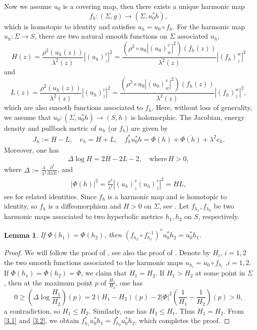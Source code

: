 \documentclass[11pt]{amsart}
\numberwithin{equation}{section}
\def\p{\partial}
\def\o{\overline}
\def\b{\bar}
\theoremstyle{plain}
\newtheorem{lemma}[thm]{Lemma}
\theoremstyle{definition}
\theoremstyle{definition}
\begin{document}
Now we assume $u_0$ is a covering map, then there exists a unique harmonic map $$f_h: (\Sigma, g)\to (\Sigma, u_0^*h),$$
which is homotopic to identity and satisfies $u_h=u_0\circ f_h$. For the harmonic map $u_h:\Sigma\to S$, there are two natural smooth functions on $\Sigma$ associated $u_h$,
$$H(z)=\frac{\rho^2(u_h(z))}{\lambda^2(z)}|(u_h)^v_z|^2=\frac{(\rho^2\circ u_0|(u_0)^v_w|^2)( f_h(z))}{\lambda^2(z)}|(f_h)^w_{z}|^2$$
and 
$$L(z)=\frac{\rho^2(u_h(z))}{\lambda^2(z)}|(u_h)^v_{\b{z}}|^2=\frac{(\rho^2\circ u_0 |(u_0)^v_w|^2)( f_h(z))}{\lambda^2(z)}|(f_h)^w_{\b{z}}|^2,$$
which are also  smooth functions associated to $f_h$. Here, without loss of generality, we assume that $u_0:(\Sigma, u_0^*h)\to (S,h)$ is holomorphic.
 The Jacobian, energy density and pullback metric of $u_h$ (or $f_h$) are given by
\begin{align}\label{3.1}
J_h:=H-L,\quad e_h=H+L,\quad f_h^*u_0^*h=\Phi(h)+\o{\Phi(h)}+\lambda^2 e_h.
\end{align}
Moreover, one has 
\begin{align*}\Delta \log H=2 H-2 L-2,\quad \text{where}\, H>0,\end{align*}
where $\Delta:=\frac{4}{\lambda^2}\frac{\p^2}{\p z\p\b{z}}$, and 
\begin{align}\label{3.2}|\Phi(h)|^2=\frac{\rho^4}{\lambda^4}|(u_h)^v_z(u_h)^v_{\b{z}}|^2=HL,\end{align}
see  \cite{Sampson, SY0, Wolf0} for related identities. 
Since $f_h$ is a harmonic map and is homotopic to identity, so $f_h$ is a  diffeomorphism  and $H> 0$ on  $\Sigma$, see \cite{Sampson, SY0}.
Let $f_{h_1}, f_{h_2}$ be two harmonic maps associated to two hyperbolic metrics $h_1,h_2$ on $S$, respectively. 
\begin{lemma}\label{lemma1}
If $\Phi(h_1)=\Phi(h_2)$, then $(f_{h_2}\circ f_{h_1}^{-1})^*u_0^*h_2=u_0^*h_1$.
\end{lemma}
\begin{proof}
	We will follow the proof of \cite[Theorem 12]{Sampson}, see also the proof of \cite[Theorem 3.1]{Wolf0}.  Denote by $H_i$, $i=1,2$ the two smooth functions associated to the harmonic maps $u_{h_i}=u_0\circ f_{h_i}$ ,$i=1,2$. If $\Phi(h_1)=\Phi(h_2)=\Phi$, we  claim that $H_1=H_2$.  If $H_1>H_2$ at some point in $\Sigma$, then at the maximum point $p$ of $\frac{H_1}{H_2}$, one has
	$$0\geq (\Delta\log\frac{H_1}{H_2})(p)=2(H_1-H_2)(p)-2|\Phi|^2(\frac{1}{H_1}-\frac{1}{H_2})(p)>0,$$	
	a contradiction, so $H_1\leq H_2$. Similarly, one has $H_2\leq H_1$. Thus $H_1=H_2$. From \eqref{3.1} and \eqref{3.2}, we obtain $f_{h_1}^*u_0^*h_1=f_{h_2}^*u_0^*h_2$, which completes the proof.
\end{proof}
\end{document}
